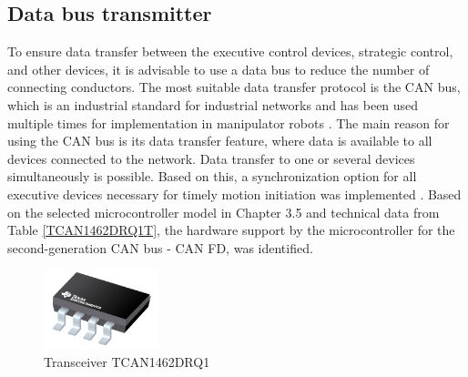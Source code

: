\subsection{Data bus transmitter}
To ensure data transfer between the executive control devices, strategic control, and other devices, it is advisable to use a data bus to reduce the number of connecting conductors. The most suitable data transfer protocol is the CAN bus, which is an industrial standard for industrial networks and has been used multiple times for implementation in manipulator robots \citep{Megalingam2021}.
The main reason for using the CAN bus is its data transfer feature, where data is available to all devices connected to the network. Data transfer to one or several devices simultaneously is possible. Based on this, a synchronization option for all executive devices necessary for timely motion initiation was implemented \citep{stmfdcan}.
Based on the selected microcontroller model in Chapter 3.5 and technical data from Table \ref{TCAN1462DRQ1T}, the hardware support by the microcontroller for the second-generation CAN bus - CAN FD, was identified.

\begin{figure}[H]
	\centering
	\includegraphics[width=0.3\textwidth]{Src/images/Trans.png}
	\caption{Transceiver TCAN1462DRQ1}
	\label{TCAN1462DRQ1}
\end{figure}





